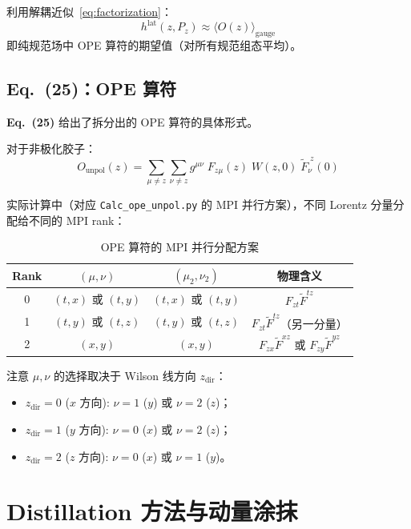 \documentclass[11pt,a4paper]{ctexart}
\newcommand{\vev}[1]{\langle #1 \rangle}
\begin{document}
利用解耦近似~\eqref{eq:factorization}：
\begin{equation}
h^{\text{lat}}(z, P_z) \approx \vev{O(z)}_{\text{gauge}}
\end{equation}
即纯规范场中 OPE 算符的期望值（对所有规范组态平均）。

\subsection{Eq.~(25)：OPE 算符}

\textbf{Eq.~(25)} 给出了拆分出的 OPE 算符的具体形式。

对于非极化胶子：
\begin{equation}\label{eq:ope_final}
\boxed{O_{\text{unpol}}(z) = \sum_{\mu \neq z} \sum_{\nu \neq z} g^{\mu\nu} \;
F_{z\mu}(z) \; W(z, 0) \; \tilde{F}_{\nu}^{\;z}(0)}
\end{equation}

实际计算中（对应 \texttt{Calc\_ope\_unpol.py} 的 MPI 并行方案），不同 Lorentz 分量分配给不同的 MPI rank：

\begin{table}[htbp]
\centering
\caption{OPE 算符的 MPI 并行分配方案}
\begin{tabular}{c c c c}
\toprule
\textbf{Rank} & \textbf{$(\mu,\nu)$} & \textbf{$(\mu_2,\nu_2)$} & \textbf{物理含义} \\
\midrule
0 & $(t, x)$ 或 $(t, y)$ & $(t, x)$ 或 $(t, y)$ & $F_{zt}\tilde{F}^{tz}$ \\
1 & $(t, y)$ 或 $(t, z)$ & $(t, y)$ 或 $(t, z)$ & $F_{zt}\tilde{F}^{tz}$（另一分量）\\
2 & $(x, y)$ & $(x, y)$ & $F_{zx}\tilde{F}^{xz}$ 或 $F_{zy}\tilde{F}^{yz}$ \\
\bottomrule
\end{tabular}
\end{table}

注意 $\mu, \nu$ 的选择取决于 Wilson 线方向 $z_{\text{dir}}$：
\begin{itemize}
  \item $z_{\text{dir}} = 0$ ($x$ 方向): $\nu = 1$ ($y$) 或 $\nu = 2$ ($z$)；
  \item $z_{\text{dir}} = 1$ ($y$ 方向): $\nu = 0$ ($x$) 或 $\nu = 2$ ($z$)；
  \item $z_{\text{dir}} = 2$ ($z$ 方向): $\nu = 0$ ($x$) 或 $\nu = 1$ ($y$)。
\end{itemize}

\section{Distillation 方法与动量涂抹}
\end{document}
